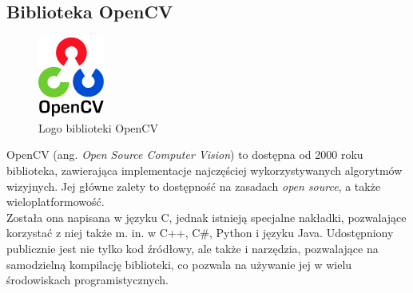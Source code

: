 \subsection{Biblioteka OpenCV}
\begin{figure}[!htb]
\centering

\includegraphics[width=82px]{img/ocv_logo}
\caption{Logo biblioteki OpenCV \cite{OpenCVLogo}}
\end{figure}
OpenCV (ang. \textit{Open Source Computer Vision}) to dostępna od 2000 roku biblioteka, zawierająca implementacje najczęściej wykorzystywanych algorytmów wizyjnych. Jej główne zalety to dostępność na zasadach \textit{open source}, a także wieloplatformowość.\\
Została ona napisana w języku C, jednak istnieją specjalne nakładki, pozwalające korzystać z niej także m. in. w C++, C\#, Python i języku Java. Udostępniony publicznie jest nie tylko kod źródłowy, ale także i narzędzia, pozwalające na samodzielną kompilację biblioteki, co pozwala na używanie jej w wielu środowiskach programistycznych.
